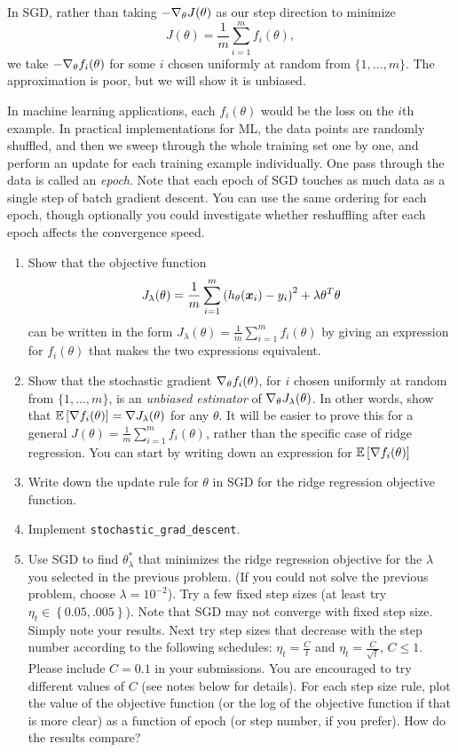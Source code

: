 \documentclass{article}
\begin{document}
In SGD, rather than taking $-\nabla_{\theta} J(\theta)$
as our step direction to minimize 
\[
J(\theta)=\frac{1}{m}\sum_{i=1}^{m}f_{i}(\theta), 
\]
we take $-\nabla_\theta f_{i}(\theta)$ for some $i$
chosen uniformly at random from $\{1,\ldots,m\}$. The approximation
is poor, but we will show it is unbiased. 

In machine learning applications, each $f_{i}(\theta)$
would be the loss on the $i$th example. In
practical implementations for ML, the data points are randomly shuffled, and then we sweep through the whole training set one by
one, and perform an update for each training example individually.
One pass through the data is called an \emph{epoch}. Note that each
epoch of SGD touches as much data as a single step of batch gradient
descent. You can use the same ordering for each epoch, though optionally
you could investigate whether reshuffling after each epoch affects
the convergence speed. 
\begin{enumerate}
\setcounter{enumi}{\value{saveenum}}
\item Show that the objective function 
\[
J_{\lambda}(\theta)=\frac{1}{m}\sum_{i=1}^{m}\left(h_{\theta}(\boldsymbol{x}_{i})-y_{i}\right)^{2}+\lambda\theta^{T}\theta
\]
can be written in the form $J_\lambda(\theta)=\frac{1}{m}\sum_{i=1}^{m}f_{i}(\theta)$
by giving an expression for $f_{i}(\theta)$ that makes the two expressions
equivalent.

\item Show that the stochastic gradient $\nabla_\theta f_{i}(\theta)$, for $i$
chosen uniformly at random from $\{1,\ldots,m\}$, is an \emph{unbiased estimator} of $\nabla_\theta J_\lambda(\theta)$. In other words, show that $\mathbb{E}\left[\nabla f_{i}(\theta)\right]=\nabla J_\lambda(\theta)$
for any $\theta$. It will be easier to prove
this for a general $J(\theta)=\frac{1}{m}\sum_{i=1}^{m}f_{i}(\theta)$,
rather than the specific case of ridge regression. You can start by
writing down an expression for $\mathbb{E}\left[\nabla f_{i}(\theta)\right]$
\item Write down the update rule for $\theta$ in SGD for the ridge
regression objective function.
\item Implement \texttt{stochastic\_grad\_descent}. 

\item Use SGD to find $\theta_{\lambda}^{*}$ that minimizes the ridge regression
objective for the $\lambda$ you selected in the previous
problem. (If you could not solve the previous problem, choose $\lambda=10^{-2}$). Try a few fixed step sizes (at least try $\eta_{t}\in\left\{ 0.05,.005\right\} $).
Note that SGD may not converge with fixed step size. Simply note your
results. Next try step sizes that decrease with the step number according
to the following schedules: $\eta_{t}=\frac{C}{t}$ and $\eta_{t}=\frac{C}{\sqrt{t}}$, $C \leq 1$. Please include $C = 0.1$ in your submissions. You are encouraged to try different values of $C$ (see notes below for details).
For each step size rule, plot the value of the objective function
(or the log of the objective function if that is more clear) as a
function of epoch (or step number, if you prefer). How do the results compare?

\setcounter{saveenum}{\value{enumi}}
\end{enumerate}
\end{document}
